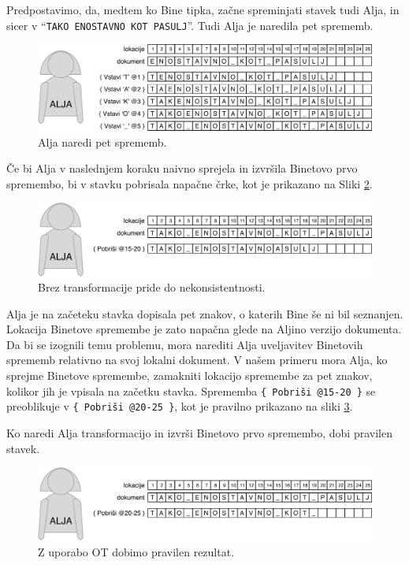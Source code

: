 \documentclass[a4paper, 12pt, twoside]{book}
\begin{document}
Predpostavimo, da, medtem ko Bine tipka, začne spreminjati stavek tudi Alja, in sicer v “{\tt TAKO ENOSTAVNO KOT PASULJ}”. Tudi Alja je naredila pet sprememb.

\begin{figure}[placement h]
\begin{center}
\includegraphics[width=12cm]{img/ot2.pdf}
\end{center}
\caption{Alja naredi pet sprememb.}
\label{ot2}
\end{figure}

Če bi Alja v naslednjem koraku naivno sprejela in izvršila Binetovo prvo spremembo, bi v stavku pobrisala napačne črke, kot je prikazano na Sliki \ref{ot3}.

\begin{figure}[placement h]
\begin{center}
\includegraphics[width=12cm]{img/ot3.pdf}
\end{center}
\caption{Brez transformacije pride do nekonsistentnosti.}
\label{ot3}
\end{figure}

Alja je na začeteku stavka dopisala pet znakov, o katerih Bine še ni bil seznanjen. Lokacija Binetove spremembe je zato napačna glede na Aljino verzijo dokumenta. Da bi se izognili temu problemu, mora narediti Alja uveljavitev Binetovih sprememb relativno na svoj lokalni dokument. V našem primeru mora Alja, ko sprejme Binetove spremembe, zamakniti lokacijo spremembe za pet znakov, kolikor jih je vpisala na začetku stavka. Sprememba {\tt \{ Pobriši @15-20 \}} se preoblikuje v {\tt \{ Pobriši @20-25 \}}, kot je pravilno prikazano na sliki \ref{ot4}.

\pagebreak

Ko naredi Alja transformacijo in izvrši Binetovo prvo spremembo, dobi pravilen stavek.

\begin{figure}[placement h]
\begin{center}
\includegraphics[width=12cm]{img/ot4.pdf}
\end{center}
\caption{Z uporabo OT dobimo pravilen rezultat.}
\label{ot4}
\end{figure}
\end{document}
